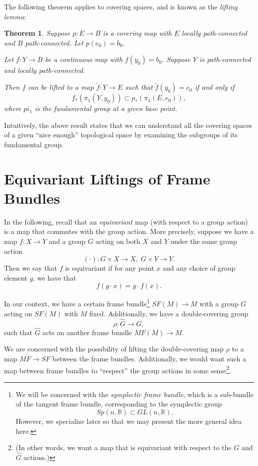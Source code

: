 \documentclass{tufte-handout}
\newtheorem{thrm}{Theorem} %
\begin{document}
The following theorem applies to covering spaces, and is known as the \emph{lifting lemma}:
\begin{fullwidth}
\begin{thrm}
Suppose $p: E \to B$ is a covering map with $E$ locally path-connected and $B$ path-connected. Let $p(e_0) = b_0$.

Let $f: Y \to B$ be a continuous map with $f(y_0) = b_0$. Suppose $Y$ is path-connected and locally path-connected.

Then $f$ can be lifted to a map $\widetilde{f}: Y \to E$ such that $\widetilde{f}(y_0) = e_0$ if and only if
$$
f_{*}(\pi_1(Y,y_0)) \subset p_{*}(\pi_1(E,e_0)),
$$
where $pi_1$ is the fundamental group at a given base point.
\end{thrm}
\end{fullwidth}
Intuitively, the above result states that we can understand all the covering spaces of a given ``nice enough'' topological space by examining the subgroups of its fundamental group.

\section{Equivariant Liftings of Frame Bundles}
In the following, recall that an \emph{equivariant} map (with respect to a group action) is a map that commutes with the group action. More precisely, suppose we have a map $f: X \to Y$ and a group $G$ acting on both $X$ and $Y$ under the same group action
$$
(\cdot): G \times X \to X, \; G \times Y \to Y.
$$
Then we say that $f$ is equivariant if for any point $x$ and any choice of group element $g$, we have that
$$
f(g\cdot x) = g\cdot f(x).
$$

In our context, we have a certain frame bundle\footnote{We will be concerned with the \emph{symplectic frame bundle}, which is a sub-bundle of the tangent frame bundle, corresponding to the symplectic group
$$
Sp(n,\mathbb{R}) \subset GL(n,\mathbb{R}).
$$
However, we specialize later so that we may present the more general idea here.} $SF(M) \to M$ with a group $G$ acting on $SF(M)$ with $M$ fixed.
Additionally, we have a double-covering group
$$
\rho: \hat{G} \to G,
$$
such that $\hat{G}$ acts on another frame bundle $MF(M) \to M$.

We are concerned with the possibility of lifting the double-covering map $\rho$ to a map $MF \to SF$ between the frame bundles. Additionally, we would want such a map between frame bundles to ``respect'' the group actions in some sense\footnote{(In other words, we want a map that is equivariant with respect to the $G$ and $\hat{G}$ actions.)}.
\end{document}
